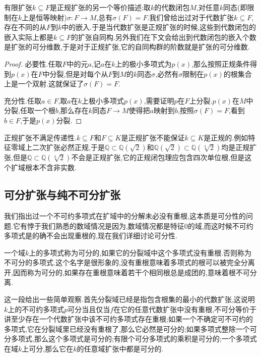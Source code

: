 有限扩张$k\subseteq F$是正规扩张的另一个等价描述:取$k$的代数闭包$M$,对任意$k$同态(即限制在$k$上是恒等映射)$\sigma:F\to M$,总有$\sigma(F)=F$.我们曾给出过对于代数扩张$k\subseteq F$,存在不同的从$F$到$\overline{k}$中的嵌入.于是当代数扩张是正规扩张的时候,这些到代数闭包的嵌入实际上都是$k\subseteq F$的扩张自同构.另外我们在下文会给出到代数闭包的嵌入个数是扩张的可分维数,于是对于正规扩张,它的自同构群的阶数就是扩张的可分维数.
\begin{proof}

必要性.任取$F$中的元$a$,记$a$在$k$上的极小多项式为$p(x)$,那么按照正规条件得到$p(x)$在$F$中分裂,但是对每个从$F$到$M$的$k$同态$\sigma$,必然有$\sigma$限制在$p(x)$的根集合上是一个双射.这就保证了$\sigma(F)=F$.

充分性.任取$a\in F$,取$a$在$k$上极小多项式$p(x)$,需要证明$p$在$F$上分裂.$p(x)$在$M$中分裂,任取一个根$b$,那么存在$k$同态$F\to M$使得把$a$映射到$b$,按照$\sigma(F)=F$,看到$b\in F$,于是$p(x)$分裂.
\end{proof}

正规扩张不满足传递性.$k\subseteq F$和$F\subseteq K$是正规扩张不能保证$k\subseteq K$是正规的.例如特征零域上二次扩张必然正规,于是$\mathbb{Q}\subset\mathbb{Q}(\sqrt{2})$和$\mathbb{Q}(\sqrt{2})\subset\mathbb{Q}(\sqrt[4]{2})$均是正规扩张,但是$\mathbb{Q}\subset\mathbb{Q}(\sqrt[4]{2})$不会是正规扩张,它的正规闭包理应包含四次单位根,但是这个扩域根本不含非实数.
\newpage
\subsection{可分扩张与纯不可分扩张}

我们指出过一个不可约多项式在扩域中的分解未必没有重根,这本质是可分性的问题.它有悖于我们熟悉的数域情况是因为,数域情况都是特征0的域,而这时候不可约多项式是的确不会出现重根的,现在我们详细讨论可分性.

一个域$k$上的多项式称为可分的,如果它的分裂域中这个多项式没有重根.否则称为不可分的多项式.这个名字是很形象的,没有重根意味着多项式的根可以被完全分离开,因而称为可分的,如果存在重根意味着若干个相同根总是成团的,意味着根不可分离.

这一段给出一些简单观察.首先分裂域已经是指包含根集的最小的代数扩张,这说明$k$上的不可约多项式$p$可分当且仅当$f$在它的任意代数扩张中没有重根,不可分等价于讲至少存在一个代数扩张中该不可约多项式存在重根;如果一个不确定可不可约的多项式,它在分裂域里已经没有重根了,那么它必然是可分的;如果多项式整除一个可分多项式,那么这个多项式是可分的;有限个可分多项式的乘积是可分的;一个多项式在域$k$上可分,那么它在$k$的任意域扩张中都是可分的.

